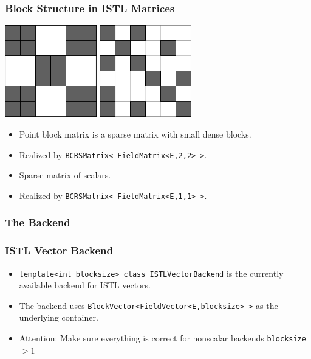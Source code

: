 \begin{frame}[fragile]
\frametitle{Block Structure in ISTL Matrices}
\begin{block}{}
\includegraphics[width=0.3\textwidth]{./EPS/pointblockmatrix}\hfill
\includegraphics[width=0.3\textwidth]{./EPS/scalarmatrix}

\begin{minipage}{0.48\textwidth}
  \begin{itemize}
  \item  Point block matrix is a sparse matrix with small dense
blocks.
\item Realized by \lstinline[basicstyle=\tiny]!BCRSMatrix< FieldMatrix<E,2,2> >!. 
  \end{itemize}
\end{minipage}
\begin{minipage}{0.48\textwidth}
  \begin{itemize}
  \item Sparse matrix of scalars.
  \item Realized by \lstinline[basicstyle=\tiny]!BCRSMatrix< FieldMatrix<E,1,1> >!.
  \end{itemize}
\end{minipage}
\end{block}
\end{frame}


\subsubsection{The Backend}
\label{sec:backend}

\begin{frame}
  \frametitle{ISTL Vector Backend}
  \begin{itemize}
  \item \lstinline!template<int blocksize> class ISTLVectorBackend!
    is the currently available backend for ISTL vectors.
  \item The backend uses
    \lstinline!BlockVector<FieldVector<E,blocksize> >! as the
    underlying container.
  \item Attention: Make sure everything is correct for nonscalar backends
    \lstinline!blocksize!$>1$
  \end{itemize}
\end{frame}

